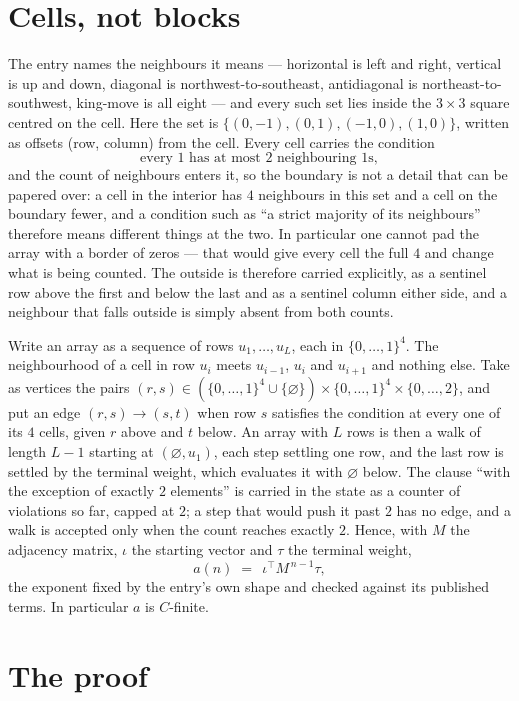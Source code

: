 \documentclass[11pt,a4paper]{article}
\theoremstyle{plain}
\theoremstyle{definition}
\begin{document}
\section{Cells, not blocks}

The entry names the neighbours it means --- horizontal is left and right, vertical is up and
down, diagonal is northwest-to-southeast, antidiagonal is northeast-to-southwest, king-move is
all eight --- and every such set lies inside the $3\times3$ square centred on the cell. Here
the set is $\{(0,-1), (0,1), (-1,0), (1,0)\}$, written as offsets (row, column) from the cell. Every cell carries
the condition
\[
\text{every 1 has at most 2 neighbouring 1s},
\]
and the count of neighbours enters it, so the boundary is not a detail that can be papered
over: a cell in the interior has $4$ neighbours in this set and a cell on the boundary
fewer, and a condition such as ``a strict majority of its neighbours'' therefore means
different things at the two. In particular one cannot pad the array with a border of zeros ---
that would give every cell the full $4$ and change what is being counted. The outside is
therefore carried
explicitly, as a sentinel row above the first and below the last and as a sentinel column
either side, and a neighbour that falls outside is simply absent from both counts.

Write an array as a sequence of rows $u_1,\dots,u_L$, each in
$\{0,\dots,1\}^{4}$. The neighbourhood of a cell in row $u_i$ meets $u_{i-1}$,
$u_i$ and $u_{i+1}$ and nothing else. Take as vertices the pairs
$(r,s)\in(\{0,\dots,1\}^{4}\cup\{\varnothing\})\times\{0,\dots,1\}^{4} \times \{0,\dots,2\}$,
and put an edge $(r,s)\to(s,t)$ when row $s$ satisfies the condition at every one of its
$4$ cells, given $r$ above and $t$ below. An array with $L$ rows is then a walk of length
$L-1$ starting at $(\varnothing,u_1)$, each step settling one row, and the last row is
settled by the terminal weight, which evaluates it with $\varnothing$ below. The clause ``with the exception of exactly $2$ elements'' is carried in
the state as a counter of violations so far, capped at $2$; a step that would push it past
$2$ has no edge, and a walk is accepted only when the count reaches exactly $2$. Hence,
with $M$ the adjacency matrix, $\iota$ the starting vector and $\tau$ the terminal weight,
\[
a(n)\;=\;\,\iota^{\!\top}M^{\,n-1}\tau ,
\]
the exponent fixed by the entry's own shape and checked against its published terms. In
particular $a$ is $C$-finite.

\section{The proof}
\end{document}
